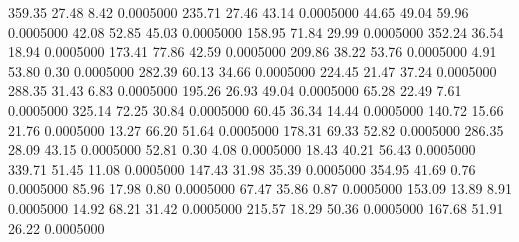  359.35   27.48    8.42   0.0005000
 235.71   27.46   43.14   0.0005000
  44.65   49.04   59.96   0.0005000
  42.08   52.85   45.03   0.0005000
 158.95   71.84   29.99   0.0005000
 352.24   36.54   18.94   0.0005000
 173.41   77.86   42.59   0.0005000
 209.86   38.22   53.76   0.0005000
   4.91   53.80    0.30   0.0005000
 282.39   60.13   34.66   0.0005000
 224.45   21.47   37.24   0.0005000
 288.35   31.43    6.83   0.0005000
 195.26   26.93   49.04   0.0005000
  65.28   22.49    7.61   0.0005000
 325.14   72.25   30.84   0.0005000
  60.45   36.34   14.44   0.0005000
 140.72   15.66   21.76   0.0005000
  13.27   66.20   51.64   0.0005000
 178.31   69.33   52.82   0.0005000
 286.35   28.09   43.15   0.0005000
  52.81    0.30    4.08   0.0005000
  18.43   40.21   56.43   0.0005000
 339.71   51.45   11.08   0.0005000
 147.43   31.98   35.39   0.0005000
 354.95   41.69    0.76   0.0005000
  85.96   17.98    0.80   0.0005000
  67.47   35.86    0.87   0.0005000
 153.09   13.89    8.91   0.0005000
  14.92   68.21   31.42   0.0005000
 215.57   18.29   50.36   0.0005000
 167.68   51.91   26.22   0.0005000

